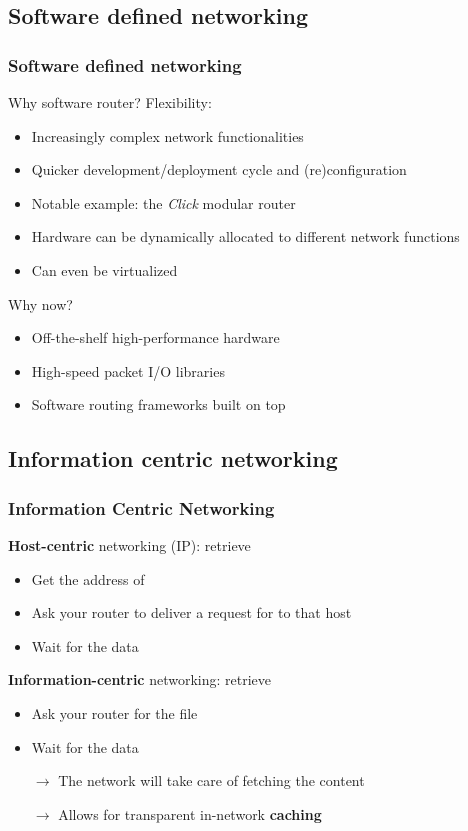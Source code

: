 \subsection{Software defined networking}
\begin{frame}[fragile]
  \frametitle{Software defined networking}
  \pause
  Why software router? \pause Flexibility:
  \begin{itemize}
    \item Increasingly complex network functionalities
    \item Quicker development/deployment cycle and (re)configuration
    \item Notable example: the \textit{Click} modular router \cite{click}
    \item Hardware can be dynamically allocated to different network functions
    \item Can even be virtualized%
      \ \cite{clickos,netvm}
  \end{itemize}
  \pause 
  Why now? \pause
  \begin{itemize}
    \item Off-the-shelf high-performance hardware
    \item High-speed packet I/O libraries%
      \ \cite{dpdk,netmap}
    \item Software routing frameworks built on top \cite{fastclick,nba}
  \end{itemize}
\end{frame}

\subsection{Information centric networking}
\begin{frame}[fragile]
  \frametitle{Information Centric Networking}
  \pause
  \textbf{Host-centric} networking (IP): retrieve 
  \pause
  \begin{itemize}
    \item Get the address of 
    \item Ask your router to deliver a request for  to that host
    \item Wait for the data
  \end{itemize}
  \pause
  \textbf{Information-centric} networking: retrieve 
  \pause
  \begin{itemize}
    \item Ask your router for the file 
    \item Wait for the data
  \pause
    \item[$\rightarrow$]
      The network will take care of fetching the content
    \item[$\rightarrow$]
      Allows for transparent in-network \textbf{caching}
  \end{itemize}
\end{frame}


